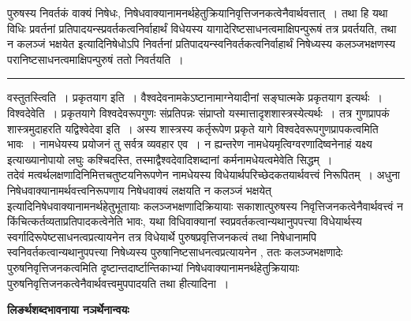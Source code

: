 \documentclass[11pt, openany]{book}
\begin{document}
{\bl पुरुषस्य निवर्तकं वाक्यं निषेधः, निषेधवाक्यानामनर्थहेतुक्रियानिवृत्तिजनकत्वेनैवार्थवत्तात्~। तथा हि यथा विधिः प्रवर्तनां  प्रतिपादयन्स्प्रवर्तकत्वनिर्वाहार्थं विधेयस्य यागादेरिष्टसाधनत्वमाक्षिपन्पुरूषं तत्र प्रवर्तयति, तथा {\qtl न कलञ्जं भक्षयेत}  इत्यादिनिषेधोऽपि निवर्तनां प्रतिपादयन्स्वनिवर्तकत्वनिर्वाहार्थं निषेध्यस्य  कलञ्जभक्षणस्य परानिष्टसाधनत्वमाक्षिपन्पुरुषं ततो निवर्तयति~।}\\
\hrule
\vspace{3mm}
\noindent
{\br वस्तुतस्त्विति~। प्रकृतयाग इति~।} वैश्वदेवनामकेऽष्टानामाग्नेयादीनां सङ्घात्मके प्रकृतयाग इत्यर्थः~। {\br विश्वदेवेति~।} प्रकृतयागे
विश्वदेवरूपगुणः संप्रतिपन्नः संप्राप्तो यस्मात्तादृशशास्त्रस्येत्यर्थः~। तत्र गुणप्रापकं शास्त्रमुदाहरति {\br यद्विश्वेदेवा इति~।} अस्य शास्त्रस्य कर्तृरूपेण प्रकृते यागे
विश्वदेवरूपगुणप्रापकत्वमिति भावः~। नामधेयस्य प्रयोजनं तु सर्वत्र व्यवहार एव~। न ह्यन्तरेण नामधेयमृत्विग्वरणादिष्वनेनाहं यक्ष्य इत्याख्यानोपायो लघुः कश्चिदस्ति, 
तस्माद्वैश्वदेवादिशब्दानां कर्मनामधेयत्वमेवेति सिद्धम्~।\\

 तदेवं मत्वर्थलक्षणादिनिमित्तचतुष्टयनिरूपणेन नामधेयस्य विधेयार्थपरिच्छेदकतयार्थवत्त्वं निरूपितम्~। अधुना निषेधवाक्यानामर्थवत्त्वनिरूपणाय निषेधवाक्यं लक्षयति {\qt न कलञ्जं भक्षयेत्} इत्यादिनिषेधवाक्यानामनर्थहेतुभूतायाः कलञ्जभक्षणादिक्रियायाः
सकाशात्पुरुषस्य निवृत्तिजनकत्वेनैवार्थवत्त्वं न किंचित्कर्तव्यताप्रतिपादकत्वेनेति भावः,  यथा विधिवाक्यानां स्वप्रवर्तकत्वान्यथानुपपत्त्या विधेयार्थस्य
स्वर्गादिरूपेष्टसाधनत्वप्रत्यायनेन तत्र विधेयार्थे पुरुषप्रवृत्तिजनकत्वं तथा निषेधानामपि स्वनिवर्तकत्वान्यथानुपपत्त्या निषेध्यस्य पुरुषानिष्टसाधनत्वप्रत्यायनेन , ततः
कलञ्जभक्षणादेः पुरुषनिवृत्तिजनकत्वमिति दृष्टान्तदार्ष्टान्तिकाभ्यां निषेधवाक्यानामनर्थहेतुक्रियायाः पुरुषनिवृत्तिजनकत्वेनैवार्थवत्त्वमुपपादयति {\br तथा हीत्यादिना~।} 
\newpage
\fancyhead[LO]{[लिङ०भा०नञर्थे० ]}
\begin{center}
 \textbf{लिङर्थशब्दभावनाया नञर्थेनान्वयः }   
\end{center}
 
\end{document}
